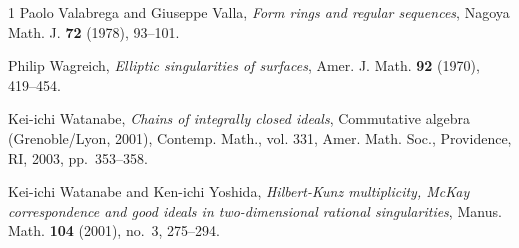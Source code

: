 \documentclass[12pt]{amsart}
\theoremstyle{definition}
\theoremstyle{remark}
\numberwithin{equation}{section}
\renewcommand{\:}{\colon}
\begin{document}
\begin{thebibliography}{1}
Paolo Valabrega and Giuseppe Valla, \emph{Form rings and regular sequences},
Nagoya Math. J. \textbf{72} (1978), 93--101. 

Philip Wagreich, \emph{Elliptic singularities of surfaces}, Amer. J. Math.
  \textbf{92} (1970), 419--454.



Kei-ichi Watanabe,
\emph{Chains of integrally closed ideals}, Commutative
  algebra ({G}renoble/{L}yon, 2001), Contemp. Math., vol. 331, Amer. Math.
  Soc., Providence, RI, 2003, pp.~353--358.

Kei-ichi Watanabe and Ken-ichi Yoshida, \emph{Hilbert-{Kunz} multiplicity,
  {McKay} correspondence and good ideals in two-dimensional rational
  singularities}, Manus. Math. \textbf{104} (2001), no.~3, 275--294.



\end{thebibliography}
\end{document}
